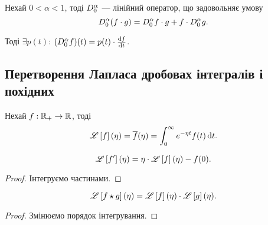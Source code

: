 \begin{theorem}[Тарасова]
    Нехай $0 < \alpha < 1$, тоді $D_0^{\alpha}$ --- лінійний оператор, що задовольняє умову
    \begin{equation}
        D_0^{\alpha}(f \cdot g) = D_0^{\alpha} f \cdot g + f \cdot D_0^{\alpha} g.
    \end{equation}
    
    Тоді $\exists p(t)$: $(D_0^{\alpha} f) (t) = p(t) \cdot \frac{\mathop{}\!\mathrm{d} f}{\mathop{}\!\mathrm{d} t}$.
\end{theorem}

\subsection{Перетворення Лапласа дробовах інтегралів і похідних}

\begin{definition}
    Нехай $f: \mathbb{R}_+ \to \mathbb{R}$, тоді 
    \begin{equation}
        \mathscr{L}\left[f\right](\eta) = \overline{f}(\eta) = \int_0^\infty e^{-\eta t} f(t) \mathop{}\!\mathrm{d} t.
    \end{equation}
\end{definition}

\begin{lemma}
    \begin{equation}
        \mathscr{L}\left[f'\right](\eta) = \eta \cdot \mathscr{L}\left[f\right](\eta) - f(0).
    \end{equation}
\end{lemma}
\begin{proof}
    Інтегруємо частинами.
\end{proof}

\begin{lemma}
    \begin{equation}
        \mathscr{L}\left[f \star g\right](\eta) = \mathscr{L}\left[f\right](\eta) \cdot \mathscr{L}\left[g\right](\eta).
    \end{equation}
\end{lemma}
\begin{proof}
    Змінюємо порядок інтегрування.
\end{proof}

